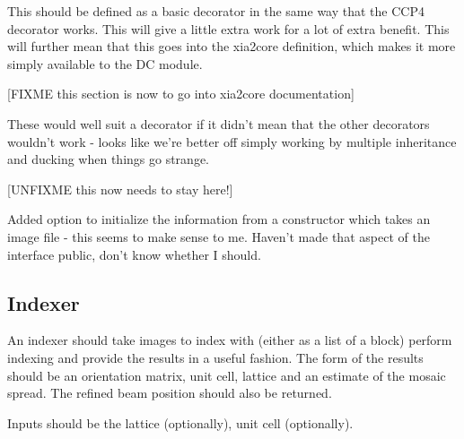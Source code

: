 \documentclass[a4paper, 11pt]{article}
\begin{document}
This should be defined as a basic decorator in the same way that the 
CCP4 decorator works. This will give a little extra work for a lot of 
extra benefit. This will further mean that this goes into the xia2core
definition, which makes it more simply available to the DC module.

[FIXME this section is now to go into xia2core documentation]

These would well suit a decorator if it didn't mean that the other
decorators wouldn't work - looks like we're better off simply working by
multiple inheritance and ducking when things go strange.

[UNFIXME this now needs to stay here!]

Added option to initialize the information from a constructor which takes
an image file - this seems to make sense to me. Haven't made that aspect
of the interface public, don't know whether I should.


\subsection{Indexer}

An indexer should take images to index with (either as a list of a block)
perform indexing and provide the results in a useful fashion. The form
of the results should be an orientation matrix, unit cell, lattice and 
an estimate of the mosaic spread. The refined beam position should also
be returned.

Inputs should be the lattice (optionally), unit cell (optionally).
\end{document}

